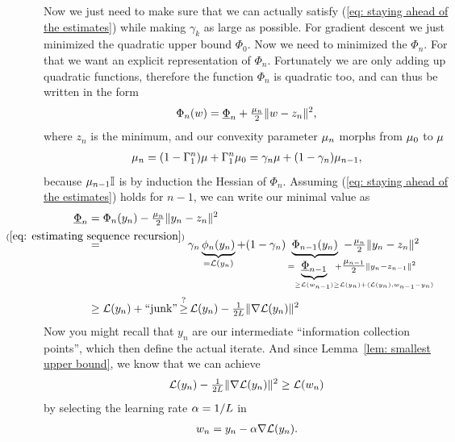 Now we just need to make sure that we can actually satisfy (\ref{eq: staying
ahead of the estimates}) while making \(\gamma_k\) as large as possible. For
gradient descent we just minimized the quadratic upper bound \(\Phi_0\). Now
we need to minimized the \(\Phi_n\). For that we want an explicit
representation of \(\Phi_n\).
Fortunately we are only adding up quadratic functions, therefore the function
\(\Phi_{n}\) is quadratic too, and can thus be written in the form
\begin{align}\label{eq: centered Phi representation}
	\Phi_{n}(w) = \underline{\Phi}_{n} + \tfrac{\mu_{n}}{2}\|w - z_n\|^2,
\end{align}
where \(z_n\) is the minimum, and our convexity parameter \(\mu_n\) morphs
from \(\mu_0\) to \(\mu\)
\begin{align}\label{eq: lbound recursion}
	\mu_n =(1-\Gamma_1^n)\mu + \Gamma_1^n \mu_0
	= \gamma_n \mu + (1-\gamma_n)\mu_{n-1},
\end{align}
because \(\mu_{n-1}\mathbb{I}\) is by induction the Hessian of \(\Phi_n\).
Assuming (\ref{eq: staying ahead of the estimates}) holds for \(n-1\), we can
write our minimal value as
\begin{align*}
	\underline{\Phi}_n
	&= \Phi_n(y_n) - \tfrac{\lbound_n}{2}\|y_n - z_n\|^2 \\
	&\lxeq{(\ref{eq: estimating sequence recursion})}
	\gamma_n \underbrace{\phi_n(y_n)}_{
		=\Loss(y_n)
	}
	+ (1-\gamma_n)\underbrace{\Phi_{n-1}(y_n)}_{
		= \underbrace{\underline{\Phi}_{n-1}}_{
			\ge \Loss(\weights_{n-1})
			\mathrlap{\ge \Loss(y_n) + \langle \Loss(y_n), \weights_{n-1} - y_n\rangle}
		} +\mathrlap{\tfrac{\lbound_{n-1}}{2}\|y_n - z_{n-1}\|^2}
	} - \tfrac{\lbound_n}{2}\|y_n - z_n\|^2 \\
	&\ge \Loss(y_n) + \text{``junk''}
	\xge{?} \Loss(y_n) - \tfrac{1}{2\ubound}\|\nabla\Loss(y_n)\|^2
\end{align*}
Now you might recall that \(y_n\) are our intermediate ``information
collection points'', which then define the actual iterate. And
since Lemma~\ref{lem: smallest upper bound}, we know that we can achieve
\begin{align*}
	\mathcal{L}(y_n) - \tfrac{1}{2L}\|\nabla\mathcal{L}(y_n)\|^2
	\ge \mathcal{L}(w_n)
\end{align*}
by selecting the learning rate \(\alpha=1/L\) in
\begin{align*}
	w_n = y_n - \alpha \nabla\mathcal{L}(y_n).
\end{align*}
